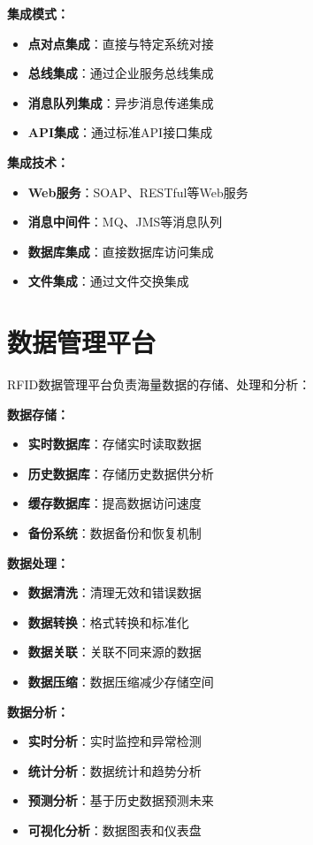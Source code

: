 \documentclass[12pt,UTF8]{ctexbook}
\begin{document}
\begin{itemize}[leftmargin=3.5em]
\begin{itemize}[leftmargin=3.5em]
\textbf{集成模式：}
\begin{itemize}[leftmargin=3.5em]
    \item \textbf{点对点集成}：直接与特定系统对接
    \item \textbf{总线集成}：通过企业服务总线集成
    \item \textbf{消息队列集成}：异步消息传递集成
    \item \textbf{API集成}：通过标准API接口集成
\end{itemize}

\textbf{集成技术：}
\begin{itemize}[leftmargin=3.5em]
    \item \textbf{Web服务}：SOAP、RESTful等Web服务
    \item \textbf{消息中间件}：MQ、JMS等消息队列
    \item \textbf{数据库集成}：直接数据库访问集成
    \item \textbf{文件集成}：通过文件交换集成
\end{itemize}

\section{数据管理平台}

RFID数据管理平台负责海量数据的存储、处理和分析：

\textbf{数据存储：}
\begin{itemize}[leftmargin=3.5em]
    \item \textbf{实时数据库}：存储实时读取数据
    \item \textbf{历史数据库}：存储历史数据供分析
    \item \textbf{缓存数据库}：提高数据访问速度
    \item \textbf{备份系统}：数据备份和恢复机制
\end{itemize}

\textbf{数据处理：}
\begin{itemize}[leftmargin=3.5em]
    \item \textbf{数据清洗}：清理无效和错误数据
    \item \textbf{数据转换}：格式转换和标准化
    \item \textbf{数据关联}：关联不同来源的数据
    \item \textbf{数据压缩}：数据压缩减少存储空间
\end{itemize}

\textbf{数据分析：}
\begin{itemize}[leftmargin=3.5em]
    \item \textbf{实时分析}：实时监控和异常检测
    \item \textbf{统计分析}：数据统计和趋势分析
    \item \textbf{预测分析}：基于历史数据预测未来
    \item \textbf{可视化分析}：数据图表和仪表盘
\end{itemize}


\end{itemize}
\end{itemize}
\end{document}
